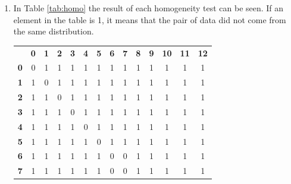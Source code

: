 \documentclass[fleqn]{article}
\begin{document}
\begin{enumerate}[label=\alph*)]
  \item In Table \ref{tab:homo} the result of each homogeneity test can be seen.
    If an element in the table is 1, it means that the pair of data did not come
    from the same distribution.
    \begin{table}[H]
      \centering
      \begin{tabular}{cccccccccccccc}
        & \textbf{0} & \textbf{1} & \textbf{2} & \textbf{3} & \textbf{4} & \textbf{5} & \textbf{6} & \textbf{7} & \textbf{8} & \textbf{9} & \textbf{10} & \textbf{11} & \textbf{12} \\ \cline{2-14}
        \multicolumn{1}{l|}{\textbf{0}}  & 0          & 1          & 1          & 1          & 1          & 1          & 1          & 1          & 1          & 1          & 1           & 1           & 1           \\
        \multicolumn{1}{l|}{\textbf{1}}  & 1          & 0          & 1          & 1          & 1          & 1          & 1          & 1          & 1          & 1          & 1           & 1           & 1           \\
        \multicolumn{1}{l|}{\textbf{2}}  & 1          & 1          & 0          & 1          & 1          & 1          & 1          & 1          & 1          & 1          & 1           & 1           & 1           \\
        \multicolumn{1}{l|}{\textbf{3}}  & 1          & 1          & 1          & 0          & 1          & 1          & 1          & 1          & 1          & 1          & 1           & 1           & 1           \\
        \multicolumn{1}{l|}{\textbf{4}}  & 1          & 1          & 1          & 1          & 0          & 1          & 1          & 1          & 1          & 1          & 1           & 1           & 1           \\
        \multicolumn{1}{l|}{\textbf{5}}  & 1          & 1          & 1          & 1          & 1          & 0          & 1          & 1          & 1          & 1          & 1           & 1           & 1           \\
        \multicolumn{1}{l|}{\textbf{6}}  & 1          & 1          & 1          & 1          & 1          & 1          & 0          & 0          & 1          & 1          & 1           & 1           & 1           \\
        \multicolumn{1}{l|}{\textbf{7}}  & 1          & 1          & 1          & 1          & 1          & 1          & 0          & 0          & 1          & 1          & 1           & 1           & 1           \\

\end{tabular}
\end{table}
\end{enumerate}
\end{document}
